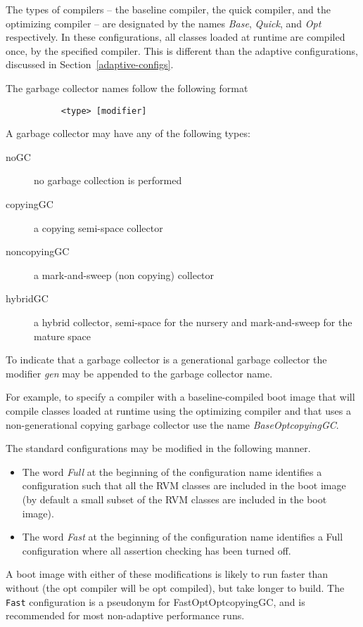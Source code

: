 The types of compilers -- the baseline compiler, the quick compiler, and 
the optimizing compiler -- are designated by the names {\em Base},
{\em Quick},  and {\em Opt} respectively.  In these configurations,
all classes loaded at runtime are compiled once, by the specified
compiler.  This is different than the adaptive configurations,
discussed in Section~\ref{adaptive-configs}.

The garbage collector names follow the following format
\begin{verbatim}
           <type> [modifier]
\end{verbatim}

A garbage collector may have any of the following types:

\begin{description}
\item[noGC] no garbage collection is performed
\item[copyingGC] a copying semi-space collector
\item[noncopyingGC] a mark-and-sweep (non copying) collector
\item[hybridGC] a hybrid collector, semi-space for the nursery and
mark-and-sweep for the mature space
\end{description}

To indicate that a garbage collector is a generational garbage collector 
the modifier {\em gen} may be appended to the garbage collector name.

For example, to specify a compiler with a baseline-compiled boot image
that will 
compile classes loaded at runtime using the optimizing compiler and that uses
a non-generational copying garbage collector use the name 
{\em BaseOptcopyingGC}.

The standard configurations may be modified in the following manner. 
\begin{itemize}
\item The word 
{\em Full} at the beginning of the configuration name identifies a 
configuration
such that all the RVM classes are included in the boot image (by default
a small subset of the RVM classes are included in the boot image). 
\item The word
{\em Fast} at the beginning of the configuration name identifies a Full
configuration where all assertion checking has been turned off. 
\end{itemize}
A boot image with
either of these modifications is likely to run faster than without
(the opt compiler will be opt compiled),
but take longer to build.  The {\tt
Fast} configuration is a pseudonym for FastOptOptcopyingGC, and is
recommended for most non-adaptive performance runs.


